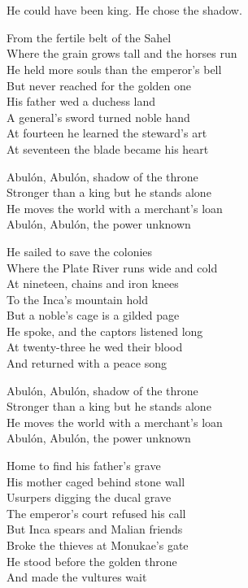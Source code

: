 \begin{lyrics}
\\
\\

He could have been king. %
He chose the shadow.

From the fertile belt of the Sahel\\
Where the grain grows tall and the horses run\\
He held more souls than the emperor's bell\\
But never reached for the golden one\\
His father wed a duchess land\\
A general's sword turned noble hand\\
At fourteen he learned the steward's art\\
At seventeen the blade became his heart

Abulón, Abulón, shadow of the throne\\
Stronger than a king but he stands alone\\
He moves the world with a merchant's loan\\
Abulón, Abulón, the power unknown

He sailed to save the colonies\\
Where the Plate River runs wide and cold\\
At nineteen, chains and iron knees\\
To the Inca's mountain hold\\
But a noble's cage is a gilded page\\
He spoke, and the captors listened long\\
At twenty-three he wed their blood\\
And returned with a peace song

Abulón, Abulón, shadow of the throne\\
Stronger than a king but he stands alone\\
He moves the world with a merchant's loan\\
Abulón, Abulón, the power unknown

Home to find his father's grave\\
His mother caged behind stone wall\\
Usurpers digging the ducal grave\\
The emperor's court refused his call\\
But Inca spears and Malian friends\\
Broke the thieves at Monukae's gate\\
He stood before the golden throne\\
And made the vultures wait


\end{lyrics}
